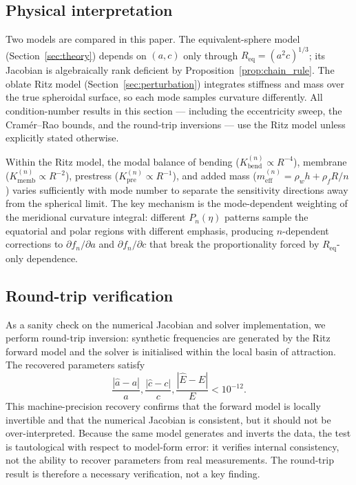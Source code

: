 \subsection{Physical interpretation}

Two models are compared in this paper.  The equivalent-sphere model
(Section~\ref{sec:theory}) depends on $(a,c)$ only through
$R_\mathrm{eq}=(a^2c)^{1/3}$; its Jacobian is algebraically rank deficient
by Proposition~\ref{prop:chain_rule}.  The oblate Ritz model
(Section~\ref{sec:perturbation}) integrates stiffness and mass over the true
spheroidal surface, so each mode samples curvature differently.  All
condition-number results in this section --- including the eccentricity sweep,
the Cram\'er--Rao bounds, and the round-trip inversions ---
use the Ritz model unless explicitly stated otherwise.

Within the Ritz model, the modal balance of bending
($K_\mathrm{bend}^{(n)} \propto R^{-4}$), membrane
($K_\mathrm{memb}^{(n)} \propto R^{-2}$), prestress
($K_\mathrm{pre}^{(n)} \propto R^{-1}$), and added mass
($m_\mathrm{eff}^{(n)} = \rho_w h + \rho_f R/n$) varies
sufficiently with mode number to separate the sensitivity directions away from
the spherical limit.  The key mechanism is the mode-dependent weighting of the
meridional curvature integral: different $P_n(\eta)$ patterns sample the
equatorial and polar regions with different emphasis, producing $n$-dependent
corrections to $\partial f_n/\partial a$ and $\partial f_n/\partial c$ that
break the proportionality forced by $R_\mathrm{eq}$-only dependence.

\subsection{Round-trip verification}

As a sanity check on the numerical Jacobian and solver implementation, we
perform round-trip inversion: synthetic frequencies are generated by the Ritz
forward model and the solver is initialised within the local basin of
attraction.  The recovered parameters satisfy
\begin{equation}
  \frac{|\hat a-a|}{a},
  \frac{|\hat c-c|}{c},
  \frac{|\hat E-E|}{E}
  < 10^{-12}.
\end{equation}
This machine-precision recovery confirms that the forward model is locally
invertible and that the numerical Jacobian is consistent, but it should not be
over-interpreted.  Because the same model generates and inverts the data, the
test is tautological with respect to model-form error: it verifies internal
consistency, not the ability to recover parameters from real measurements.
The round-trip result is therefore a necessary verification, not a key finding.

